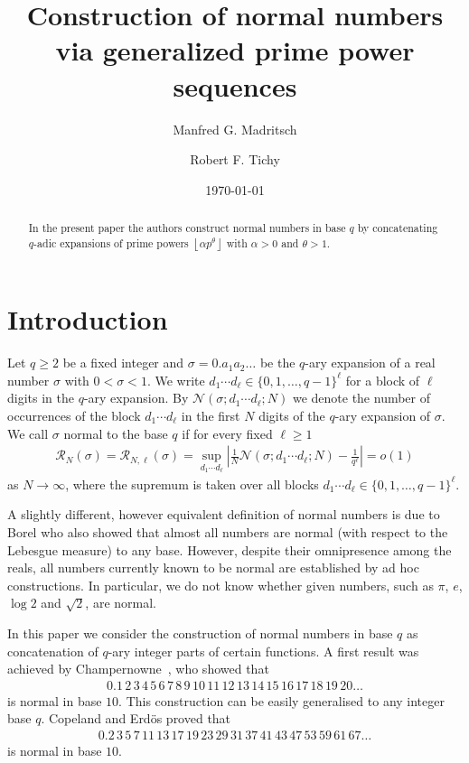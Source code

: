 \documentclass[a4paper,10pt]{amsart}
\title{Construction of normal numbers via generalized prime power sequences}
\author[M. G. Madritsch]{Manfred G. Madritsch}
\author[R. F. Tichy]{Robert F. Tichy}
\date{\today}
\numberwithin{equation}{section}
\theoremstyle{definition}
\theoremstyle{remark}
\newcommand{\lf}{\left\lfloor}
\newcommand{\rf}{\right\rfloor}
\renewcommand{\lvert}{\left\vert}
\renewcommand{\rvert}{\right\vert}
\begin{document}
\begin{abstract}
In the present paper the authors construct normal numbers in base $q$
by concatenating $q$-adic expansions of prime powers $\lf\alpha
p^\theta\rf$ with $\alpha>0$ and $\theta>1$.
\end{abstract}

\maketitle

\section{Introduction}

Let $q\geq 2$ be a fixed integer and $\sigma=0.a_1a_2\dots$ be the
$q$-ary expansion of a real number $\sigma$ with $0<\sigma<1$. We
write $d_1\cdots d_\ell\in\{0,1,\dots,q-1\}^\ell$ for a block of $\ell$
digits in the $q$-ary expansion. By $\mathcal{N}(\sigma;d_1\cdots
d_\ell;N)$ we denote the number of occurrences of the block $d_1\cdots
d_\ell$ in the first $N$ digits of the $q$-ary expansion of $\sigma$.
We call $\sigma$ normal to the base $q$ if for every
fixed $\ell\geq 1$
\begin{align*}
\mathcal{R}_N(\sigma)=\mathcal{R}_{N,\ell}(\sigma)= \sup_{d_1\cdots
d_\ell}\lvert\frac{1}{N}\mathcal{N}(\sigma;d_1\cdots d_\ell;N)
  -\frac{1}{q^\ell}\rvert=o(1)
\end{align*}
as $N\rightarrow\infty$, where the supremum is taken over all
blocks $d_1\cdots d_\ell\in\{0,1,\dots,q-1\}^\ell$.

A slightly different, however equivalent definition of normal numbers is due to
Borel \cite{Borel1909:les_probabilites_denombrables} who also showed that
almost all numbers are normal (with respect to the Lebesgue measure) to any
base. However, despite their omnipresence among the reals, all numbers
currently known to be normal are established by ad hoc constructions. In
particular, we do not know whether given numbers, such as $\pi$, $e$, $\log 2$
and $\sqrt 2$, are normal.

In this paper we consider the construction of normal numbers in
base $q$ as concatenation of $q$-ary integer parts of certain
functions. A first result was achieved by
Champernowne~\cite{Champernowne1933:construction_decimals_normal}, who showed that 
\begin{align*}
0.1\,2\,3\,4\,5\,6\,7\,8\,9\,10\,11\,12\,13\,14\,15\,16\,17\,18\,19\,20\dots
\end{align*}
is normal in base $10$. This construction can be easily
generalised to any integer base $q$. Copeland and Erd{\"o}s
\cite{copeland_erdoes1946:note_on_normal} proved that
\begin{align*}
0.2\,3\,5\,7\,11\,13\,17\,19\,23\,29\,31\,37\,41\,43\,47\,53\,59\,61\,67\dots
\end{align*}
is normal in base $10$.
\end{document}
